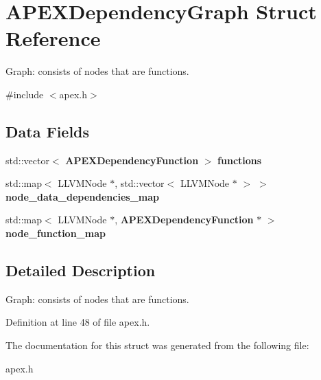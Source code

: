 \section{A\+P\+E\+X\+Dependency\+Graph Struct Reference}
\label{structAPEXDependencyGraph}


Graph\+: consists of nodes that are functions.  




{\ttfamily \#include $<$apex.\+h$>$}

\subsection*{Data Fields}
\begin{DoxyCompactItemize}
\item 
\mbox{\label{structAPEXDependencyGraph_ab358b0afe44dc73e8db4c53689de6aa8}} 
std\+::vector$<$ \textbf{ A\+P\+E\+X\+Dependency\+Function} $>$ {\bfseries functions}
\item 
\mbox{\label{structAPEXDependencyGraph_af6237ef27a89f712d5fe205f9052c31f}} 
std\+::map$<$ L\+L\+V\+M\+Node $\ast$, std\+::vector$<$ L\+L\+V\+M\+Node $\ast$ $>$ $>$ {\bfseries node\+\_\+data\+\_\+dependencies\+\_\+map}
\item 
\mbox{\label{structAPEXDependencyGraph_a582babaf3ee3b4c17c347d1c2917515d}} 
std\+::map$<$ L\+L\+V\+M\+Node $\ast$, \textbf{ A\+P\+E\+X\+Dependency\+Function} $\ast$ $>$ {\bfseries node\+\_\+function\+\_\+map}
\end{DoxyCompactItemize}


\subsection{Detailed Description}
Graph\+: consists of nodes that are functions. 

Definition at line 48 of file apex.\+h.



The documentation for this struct was generated from the following file\+:\begin{DoxyCompactItemize}
\item 
apex.\+h\end{DoxyCompactItemize}

